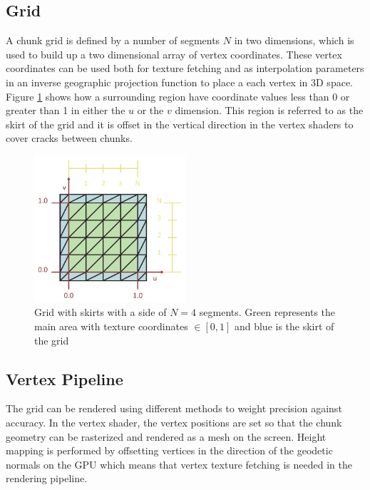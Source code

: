 \subsection{Grid}

A chunk grid is defined by a number of segments $N$ in two dimensions, which is used to build up a two dimensional array of vertex coordinates. These vertex coordinates can be used both for texture fetching and as interpolation parameters in an inverse geographic projection function to place a each vertex in 3D space. Figure \ref{fig:grid} shows how a surrounding region have coordinate values less than 0 or greater than 1 in either the $u$ or the $v$ dimension. This region is referred to as the skirt of the grid and it is offset in the vertical direction in the vertex shaders to cover cracks between chunks.

\begin{figure}[htbp]
    \centering
    \includegraphics[width=0.5\textwidth]{figures/implementation/rendering/grid.pdf}
    \caption{Grid with skirts with a side of $N=4$ segments. Green represents the main area with texture coordinates $\in \left[  0, 1 \right] $ and blue is the skirt of the grid}
    \label{fig:grid}
\end{figure}

\subsection{Vertex Pipeline}

The grid can be rendered using different methods to weight precision against accuracy. In the vertex shader, the vertex positions are set so that the chunk geometry can be rasterized and rendered as a mesh on the screen. Height mapping is performed by offsetting vertices in the direction of the geodetic normals on the GPU which means that vertex texture fetching is needed in the rendering pipeline.

